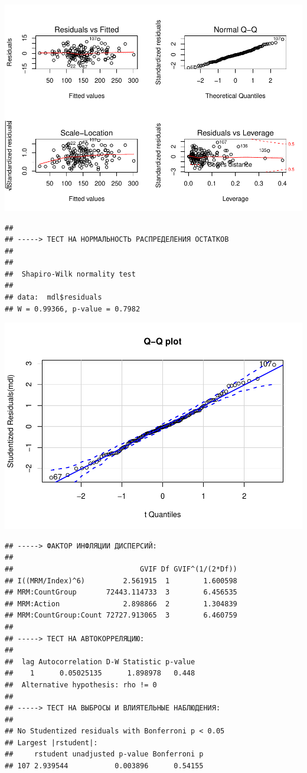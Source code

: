 \documentclass[
]{article}
\begin{document}
\begin{center}\includegraphics{Regression-model-for-estimating-RM_files/figure-latex/unnamed-chunk-34-4} \end{center}

\begin{verbatim}
## 
## -----> ТЕСТ НА НОРМАЛЬНОСТЬ РАСПРЕДЕЛЕНИЯ ОСТАТКОВ
## 
## 
##  Shapiro-Wilk normality test
## 
## data:  mdl$residuals
## W = 0.99366, p-value = 0.7982
\end{verbatim}

\begin{center}\includegraphics{Regression-model-for-estimating-RM_files/figure-latex/unnamed-chunk-34-5} \end{center}

\begin{verbatim}
## -----> ФАКТОР ИНФЛЯЦИИ ДИСПЕРСИЙ:
## 
##                              GVIF Df GVIF^(1/(2*Df))
## I((MRM/Index)^6)         2.561915  1        1.600598
## MRM:CountGroup       72443.114733  3        6.456535
## MRM:Action               2.898866  2        1.304839
## MRM:CountGroup:Count 72727.913065  3        6.460759
## 
## -----> ТЕСТ НА АВТОКОРРЕЛЯЦИЮ:
## 
##  lag Autocorrelation D-W Statistic p-value
##    1      0.05025135      1.898978   0.448
##  Alternative hypothesis: rho != 0
## 
## -----> ТЕСТ НА ВЫБРОСЫ И ВЛИЯТЕЛЬНЫЕ НАБЛЮДЕНИЯ:
## 
## No Studentized residuals with Bonferroni p < 0.05
## Largest |rstudent|:
##     rstudent unadjusted p-value Bonferroni p
## 107 2.939544           0.003896      0.54155
\end{verbatim}
\end{document}
